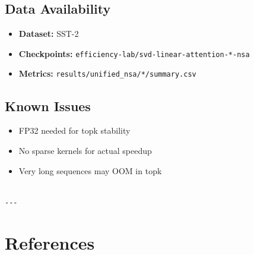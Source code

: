 \subsection{Data Availability}

\begin{itemize}
\item \textbf{Dataset:} SST-2
\item \textbf{Checkpoints:} \texttt{efficiency-lab/svd-linear-attention-*-nsa}
\item \textbf{Metrics:} \texttt{results/unified\_nsa/*/summary.csv}

\end{itemize}
\subsection{Known Issues}

\begin{itemize}
\item FP32 needed for topk stability
\item No sparse kernels for actual speedup
\item Very long sequences may OOM in topk
\end{itemize}
\begin{lstlisting}

---
\end{lstlisting}


\section{References}

